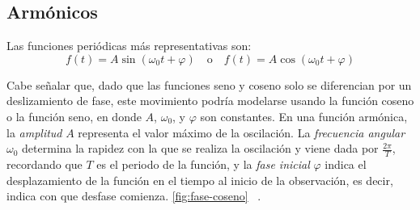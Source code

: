 \subsection{Armónicos}
Las funciones periódicas más representativas son:
\begin{equation}
	f(t) = A \sin(\omega_0 t + \varphi) \quad \text{o} \quad f(t) = A \cos(\omega_0 t + \varphi)
\end{equation}

Cabe señalar que, dado que las funciones seno y coseno solo se diferencian por un deslizamiento de fase, este movimiento podría modelarse usando la función coseno o la función seno, en donde \(A\), \(\omega_0\), y \(\varphi\) son constantes. En una función armónica, la \textit{amplitud} \(A\) representa el valor máximo de la oscilación. La \textit{frecuencia angular} \(\omega_0\) determina la rapidez con la que se realiza la oscilación y viene dada por $\frac{2\pi}{T}$, recordando que $T$ es el periodo de la función, y la \textit{fase inicial} \(\varphi\) indica el desplazamiento de la función en el tiempo al inicio de la observación, es decir, indica con que desfase comienza. \ref{fig:fase-coseno} ~\cite{armonicosOpenStax}. 

